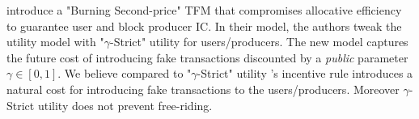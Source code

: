 \citet{chung2023foundations} introduce a "Burning Second-price" TFM that compromises allocative efficiency to guarantee user and block producer IC. In their model, the authors tweak the utility model with "$\gamma$-Strict" utility for users/producers. The new model captures the future cost of introducing fake transactions discounted by a \textit{public} parameter $\gamma\in [0,1]$. We believe compared to  "$\gamma$-Strict" utility \ourTFM's incentive rule introduces a natural cost for introducing fake transactions to the users/producers. Moreover $\gamma$-Strict utility does not prevent free-riding.




